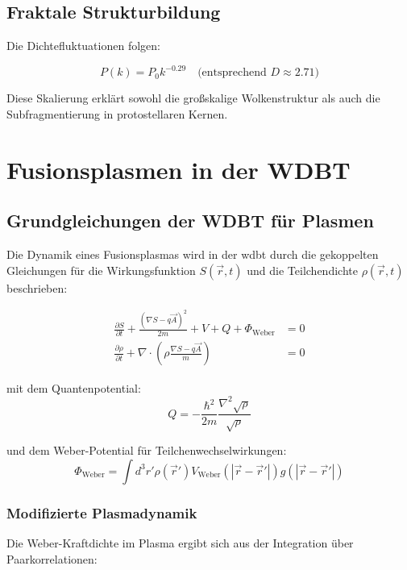 \section{Fraktale Strukturbildung}
Die Dichtefluktuationen folgen:

\begin{equation}
P(k) = P_0 k^{-0.29} \quad \text{(entsprechend } D \approx 2.71\text{)}
\end{equation}

Diese Skalierung erklärt sowohl die großskalige Wolkenstruktur als auch die Subfragmentierung in protostellaren Kernen.

\chapter{Fusionsplasmen in der WDBT}
\section{Grundgleichungen der WDBT für Plasmen}

Die Dynamik eines Fusionsplasmas wird in der \gls{wdbt} durch die gekoppelten Gleichungen für die Wirkungsfunktion $S(\vec{r},t)$ und die Teilchendichte $\rho(\vec{r},t)$ beschrieben:

\begin{align}
\frac{\partial S}{\partial t} + \frac{(\nabla S - q\vec{A})^2}{2m} + V + Q + \Phi_{\text{Weber}} &= 0 \label{eq:C1} \\
\frac{\partial \rho}{\partial t} + \nabla \cdot \left(\rho \frac{\nabla S - q\vec{A}}{m}\right) &= 0 \label{eq:C2}
\end{align}

mit dem Quantenpotential:
\begin{equation}
Q = -\frac{\hbar^2}{2m} \frac{\nabla^2 \sqrt{\rho}}{\sqrt{\rho}} \label{eq:Q}
\end{equation}

und dem Weber-Potential für Teilchenwechselwirkungen:
\begin{equation}
\Phi_{\text{Weber}} = \int d^3r' \rho(\vec{r}') V_{\text{Weber}}(|\vec{r}-\vec{r}'|) g(|\vec{r}-\vec{r}'|)
\end{equation}

\subsection{Modifizierte Plasmadynamik}

Die Weber-Kraftdichte im Plasma ergibt sich aus der Integration über Paarkorrelationen:

